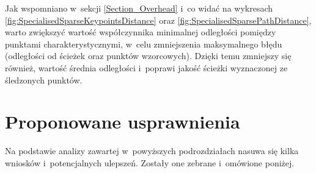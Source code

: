     Jak wspomniano w~sekcji \ref{Section_Overhead} i~co widać na wykresach \ref{fig:SpecialisedSparseKeypointsDistance} oraz \ref{fig:SpecialisedSparsePathDistance}, warto zwiększyć wartość współczynnika minimalnej odległości pomiędzy punktami charakterystycznymi, w~celu zmniejszenia maksymalnego błędu (odległości od ścieżek oraz punktów wzorcowych). Dzięki temu zmniejszy się również, wartość średnia odległości i~poprawi jakość ścieżki wyznaczonej ze śledzonych punktów.

  \section{Proponowane usprawnienia}\label{Section_Usprawnienia}

    Na podstawie analizy zawartej w~powyższych podrozdziałach nasuwa się kilka wniosków i~potencjalnych ulepszeń. Zostały one zebrane i~omówione poniżej.

